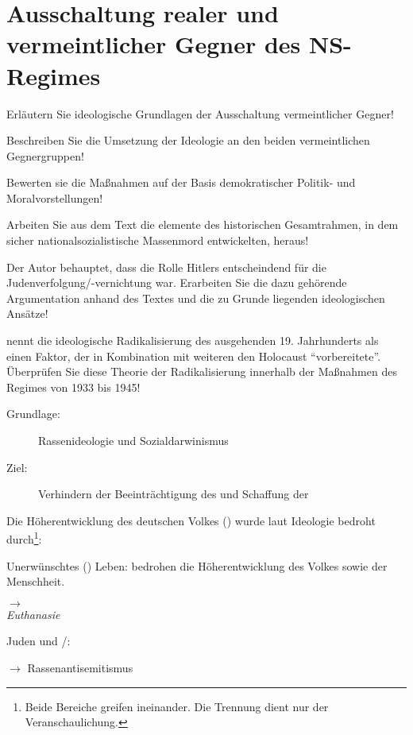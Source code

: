 \section{Ausschaltung realer und vermeintlicher Gegner des NS-Regimes}
\label{sec:aussch-gegner}

\begin{aufgabe}
Erläutern Sie ideologische Grundlagen der Ausschaltung vermeintlicher
Gegner!

Beschreiben Sie die Umsetzung der Ideologie an den beiden
vermeintlichen Gegnergruppen! 

Bewerten sie die Maßnahmen auf der Basis demokratischer Politik- und
Moralvorstellungen!
\end{aufgabe}

\begin{aufgabe}
Arbeiten Sie aus dem Text die elemente des historischen Gesamtrahmen,
in dem sicher nationalsozialistische Massenmord entwickelten, heraus!

Der Autor behauptet, dass die Rolle Hitlers entscheindend für die
Judenverfolgung/-vernichtung war. Erarbeiten Sie die dazu gehörende
Argumentation anhand des Textes und die zu Grunde liegenden
ideologischen Ansätze!

 nennt die ideologische
Radikalisierung des ausgehenden 19. Jahrhunderts als einen Faktor, der
in Kombination mit weiteren den Holocaust \enquote{vorbereitete}.
Überprüfen Sie diese Theorie der Radikalisierung innerhalb der
Maßnahmen des Regimes von 1933 bis 1945!
\end{aufgabe}


\begin{description}
\item[Grundlage:] Rassenideologie und Sozialdarwinismus
 
\item[Ziel:] Verhindern der Beeinträchtigung des  und Schaffung der 
\end{description}

Die Höherentwicklung des deutschen Volkes () wurde
laut Ideologie bedroht durch\footnote{Beide Bereiche greifen
ineinander. Die Trennung dient nur der Veranschaulichung.}:

\begin{multicols}{2}
Unerwünschtes () Leben:
 bedrohen die Höherentwicklung des Volkes
sowie der Menschheit.

$\rightarrow$ \\

\emph{Euthanasie}

\columnbreak

Juden und /: 

$\rightarrow$ Rassenantisemitismus\\

\emph{}
\end{multicols}

